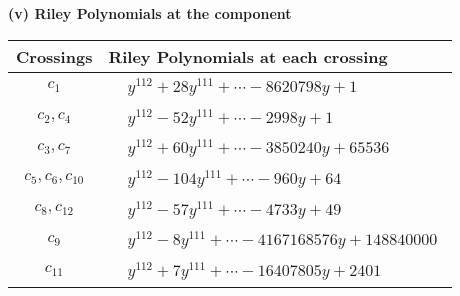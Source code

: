 \documentclass[1p]{elsarticle_modified}
\theoremstyle{definition}
\begin{document}
\flushleft \textbf{(v) Riley Polynomials at the component}\newline \\
\begin{tabular}{m{50pt}|m{274pt}}
Crossings & \hspace{64pt}Riley Polynomials at each crossing \\
\hline $$\begin{aligned}c_{1}\end{aligned}$$&$\begin{aligned}
&y^{112}+28 y^{111}+\cdots-8620798 y+1
\end{aligned}$\\
\hline $$\begin{aligned}c_{2},c_{4}\end{aligned}$$&$\begin{aligned}
&y^{112}-52 y^{111}+\cdots-2998 y+1
\end{aligned}$\\
\hline $$\begin{aligned}c_{3},c_{7}\end{aligned}$$&$\begin{aligned}
&y^{112}+60 y^{111}+\cdots-3850240 y+65536
\end{aligned}$\\
\hline $$\begin{aligned}c_{5},c_{6},c_{10}\end{aligned}$$&$\begin{aligned}
&y^{112}-104 y^{111}+\cdots-960 y+64
\end{aligned}$\\
\hline $$\begin{aligned}c_{8},c_{12}\end{aligned}$$&$\begin{aligned}
&y^{112}-57 y^{111}+\cdots-4733 y+49
\end{aligned}$\\
\hline $$\begin{aligned}c_{9}\end{aligned}$$&$\begin{aligned}
&y^{112}-8 y^{111}+\cdots-4167168576 y+148840000
\end{aligned}$\\
\hline $$\begin{aligned}c_{11}\end{aligned}$$&$\begin{aligned}
&y^{112}+7 y^{111}+\cdots-16407805 y+2401
\end{aligned}$\\
\hline
\end{tabular}\\~\\
\end{document}
